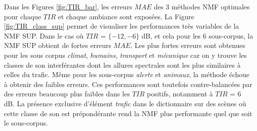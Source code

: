 Dans les Figures \ref{fig:TIR_bar}, les erreurs $MAE$ des 3 méthodes NMF optimales pour chaque $TIR$ et chaque ambiance sont exposées. La Figure \ref{fig:TIR_class_sup} permet de visualiser les performances très variables de la NMF SUP. Dans le cas où $TIR$ = $\lbrace -12, -6 \rbrace$ dB, et cela pour les 6 sous-corpus, la NMF SUP obtient de fortes erreurs $MAE$. Les plus fortes erreurs sont obtenues pour les sous corpus \textit{climat}, \textit{humains}, \textit{transport} et \textit{mécanique} car on y trouve les classes de son interférantes dont les allures spectrales sont les plus similaires à celles du trafic.
Même pour les sous-corpus \textit{alerte} et \textit{animaux}, la méthode échoue à obtenir des faibles erreurs. Ces performances sont toutefois contre-balancées par des erreurs beaucoup plus faibles dans les $TIR$ positifs, notamment à $TIR$ = 6 dB. La présence exclusive d'élément \textit{trafic} dans le dictionnaire sur des scènes où cette classe de son est prépondérante rend la NMF plus performante quel que soit le sous-corpus.

